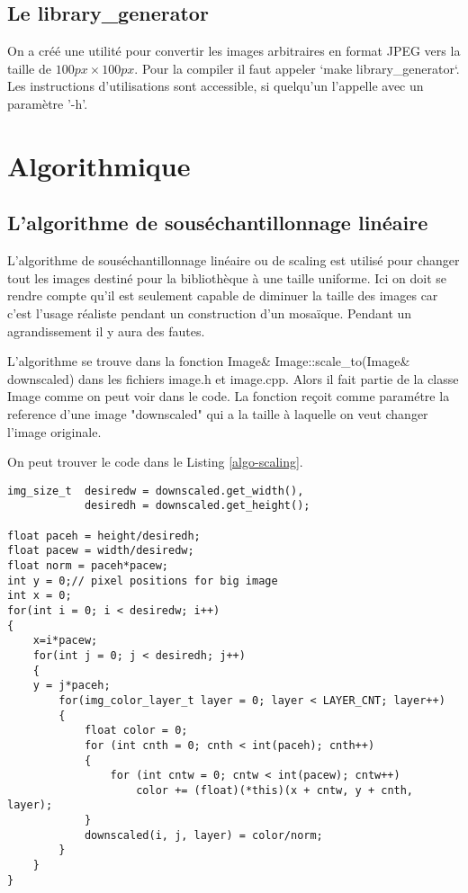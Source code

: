 \documentclass[a4paper]{article}
\begin{document}
\subsection{Le library\_generator}
On a cr\'e\'e une utilit\'e pour convertir les images arbitraires en format JPEG vers la taille de $ 100px \times 100px $.
Pour la compiler il faut appeler `make library\_generator`.
Les instructions d'utilisations sont accessible, si quelqu'un l'appelle avec un param\`etre '-h'.

\section{Algorithmique}

\subsection{L'algorithme de sous\'echantillonnage lin\'eaire}

L'algorithme de sous\'echantillonnage lin\'eaire ou de scaling est utilis\'e pour changer tout les images destin\'e pour la bibliothèque \`a une taille uniforme.
Ici on doit se rendre compte qu'il est seulement capable de diminuer la taille des images car c'est l'usage r\'ealiste pendant un construction d'un mosa\"{i}que.  
Pendant un agrandissement il y aura des fautes.

L'algorithme se trouve dans la fonction Image\& Image::scale\_to(Image\& downscaled) dans les fichiers image.h et image.cpp.
Alors il fait partie de la classe Image comme on peut voir dans le code.
La fonction re\c{c}oit comme param\'etre la reference d'une image "downscaled" qui a la taille \`a laquelle on veut changer l'image originale.

On peut trouver le code dans le Listing \ref{algo-scaling}.
\begin{lstlisting}
img_size_t	desiredw = downscaled.get_width(),
			desiredh = downscaled.get_height();

float paceh = height/desiredh;
float pacew = width/desiredw;
float norm = paceh*pacew;
int y = 0;// pixel positions for big image
int x = 0;
for(int i = 0; i < desiredw; i++)
{
	x=i*pacew;
	for(int j = 0; j < desiredh; j++)
	{
	y = j*paceh;
		for(img_color_layer_t layer = 0; layer < LAYER_CNT; layer++)
		{
			float color = 0;
			for (int cnth = 0; cnth < int(paceh); cnth++)
			{
				for (int cntw = 0; cntw < int(pacew); cntw++)
					color += (float)(*this)(x + cntw, y + cnth, layer);
			}
			downscaled(i, j, layer) = color/norm;
		}
	}	
}
\end{lstlisting}
\end{document}
